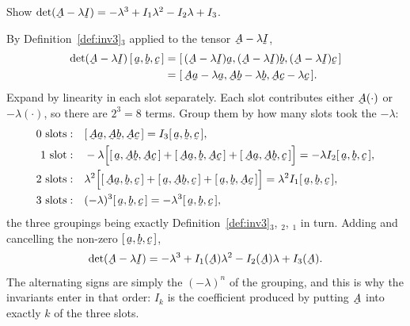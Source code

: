 \begin{problem}
Show $\det(\bA-\lambda\I)=-\lambda^3+I_1\lambda^2-I_2\lambda+I_3$.
\end{problem}
\begin{solution}
By Definition~\ref{def:inv3}$_3$ applied to the tensor $\bA-\lambda\I$,
\[
\begin{aligned}
   \det(\bA-\lambda\I)\,\tbox\ba\bb\bc
   &=\tbox{(\bA-\lambda\I)\ba}{(\bA-\lambda\I)\bb}{(\bA-\lambda\I)\bc}\\
   &=\tbox{\bA\ba-\lambda\ba}{\bA\bb-\lambda\bb}{\bA\bc-\lambda\bc}.
\end{aligned}
\]
Expand by linearity in each slot separately. Each slot contributes either
$\bA(\cdot)$ or $-\lambda(\cdot)$, so there are $2^{3}=8$ terms. Group
them by how many slots took the $-\lambda$:
\[
\begin{aligned}
   0\ \text{slots}:&\quad \tbox{\bA\ba}{\bA\bb}{\bA\bc}
     =I_{3}\tbox\ba\bb\bc,\\
   1\ \text{slot}:&\quad -\lambda\Big[
     \tbox{\ba}{\bA\bb}{\bA\bc}+\tbox{\bA\ba}{\bb}{\bA\bc}
     +\tbox{\bA\ba}{\bA\bb}{\bc}\Big]=-\lambda I_{2}\tbox\ba\bb\bc,\\
   2\ \text{slots}:&\quad \lambda^{2}\Big[
     \tbox{\bA\ba}{\bb}{\bc}+\tbox{\ba}{\bA\bb}{\bc}
     +\tbox{\ba}{\bb}{\bA\bc}\Big]=\lambda^{2}I_{1}\tbox\ba\bb\bc,\\
   3\ \text{slots}:&\quad (-\lambda)^{3}\tbox\ba\bb\bc
     =-\lambda^{3}\tbox\ba\bb\bc,
\end{aligned}
\]
the three groupings being exactly Definition~\ref{def:inv3}$_{3}$,
$_{2}$, $_{1}$ in turn. Adding and cancelling the non-zero
$\tbox\ba\bb\bc$,
\[
   \det(\bA-\lambda\I)=-\lambda^{3}+I_{1}(\bA)\lambda^{2}
   -I_{2}(\bA)\lambda+I_{3}(\bA).
\]
The alternating signs are simply the $(-\lambda)^{n}$ of the grouping, and
this is why the invariants enter  in that order: $I_{k}$ is the
coefficient produced by putting $\bA$ into exactly $k$ of the three slots.
\end{solution}

